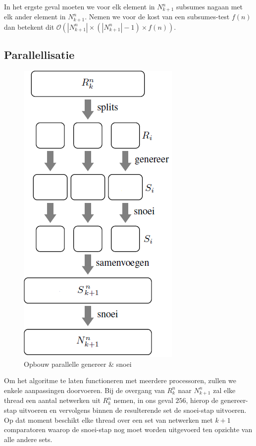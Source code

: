 \documentclass{article}
\begin{document}
In het ergste geval moeten we voor elk element in $N^n_{k+1}$ subsumes nagaan met elk ander element in $N^n_{k+1}$.
Nemen we voor de kost van een subsumes-test $f(n)$ dan betekent dit $\mathcal{O}\left(|N^n_{k+1}| \times \left(|N^n_{k+1}|-1\right) \times f(n) \right) $.

\subsection{Parallellisatie}\label{Parallellisatie}
\begin{figure}
	\vspace{-10pt}
	\centering
	\includegraphics[scale=0.5]{Gen_Prune_Opbouw.png}
	\caption{Opbouw parallelle genereer \& snoei}
	\label{opbouwGenPrune}
\end{figure}
Om het algoritme te laten functioneren met meerdere processoren, zullen we enkele aanpassingen doorvoeren.
Bij de overgang van $R^n_k$ naar $N^n_{k+1}$ zal elke thread een aantal netwerken uit $R^n_k$ nemen, in ons geval $256$, hierop de genereer-stap uitvoeren en vervolgens binnen de resulterende set de snoei-stap uitvoeren.
Op dat moment beschikt elke thread over een set van netwerken met $k+1$ comparatoren waarop de snoei-stap nog moet worden uitgevoerd ten opzichte van alle andere sets.
\end{document}
